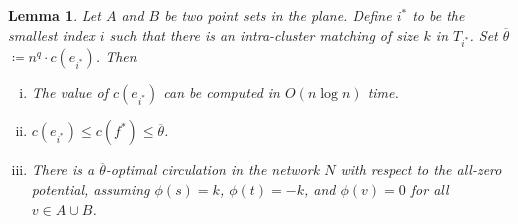 \documentclass[11pt]{article}
\def\fsupply{\phi}
\def\cost{c}
\newtheorem{lemma}{Lemma}[section]
\numberwithin{figure}{section}
\def\EMPH#1{\textcolor{BrickRed}{{\emph{#1}}}}
\begin{document}
\begin{lemma}
\label{lemma:starting_scale}
Let $A$ and $B$ be two point sets in the plane.
Define \EMPH{$i^*$} to be the smallest index $i$ such that there is an
intra-cluster matching of size $k$ in $T_{i^*}$.
Set \EMPH{$\overline{\theta}$} $\coloneqq n^q \cdot c(e_{i^*})$.
Then
\begin{enumerate}[(i)]
\item \label{item:starting_scale1}
	The value of $c(e_{i^*})$ can be computed in $O(n\log n)$ time.
\item \label{item:starting_scale2}
	$c(e_{i^*}) \leq \cost(f^*) \leq \overline{\theta}$.
\item \label{item:starting_scale3}
	There is a $\overline{\theta}$-optimal circulation in the network $N$ with
	respect to the all-zero potential, assuming $\fsupply(s) = k$,
	$\fsupply(t) = -k$, and $\fsupply(v) = 0$ for all $v \in A \cup B$.
\end{enumerate}
\end{lemma}
\end{document}
